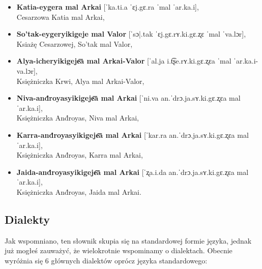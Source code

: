 \begin{spacing}{1.1}
\begin{itemize}
\item \textbf{Katia-eygera mal Arkai} [ˈka.ti.a ˈɛj.gɛ.ra ˈmal ˈar.ka.i],\\ 
Cesarzowa Katia mal Arkai,
\item \textbf{So'tak-eygeryikigeje mal Valor} [ˈsɔ|.tak ˈɛj.gɛ.rʏ.ki.gɛ.ʐɛ 
ˈmal ˈva.lɔr],\\ Ksiażę Cesarzowej, So'tak mal Valor,
\item \textbf{Alya-icheryikigeje͞a mal Arkai-Valor} [ˈal.ja i.t͡ʂe.rʏ.ki.gɛ.ʐɛa ˈmal 
ˈar.ka.i-va.lɔr],\\ Księżniczka Krwi, Alya mal Arkai-Valor,
\item \textbf{Niva-and́royasyikigeje͞a mal Arkai} [ˈni.va an.ˈdrɔ.ja.sʏ.ki.gɛ.ʐɛa 
mal ˈar.ka.i],\\ Księżniczka And́royas, Niva mal Arkai,
\item \textbf{Karra-and́royasyikigeje͞a mal Arkai} [ˈkar.ra an.ˈdrɔ.ja.sʏ.ki.gɛ.ʐɛa 
mal ˈar.ka.i],\\ Księżniczka And́royas, Karra mal Arkai,
\item \textbf{Jaida-and́royasyikigeje͞a mal Arkai} [ˈʐa.i.da an.ˈdrɔ.ja.sʏ.ki.gɛ.ʐɛa
mal ˈar.ka.i],\\ Księżniczka And́royas, Jaida mal Arkai.
\end{itemize}


\subsection{Dialekty}
Jak wspomniano, ten słownik skupia się na standardowej formie języka, jednak już
mogłeś zauważyć, że wielokrotnie wspominamy o dialektach. Obecnie wyróżnia się 6
głównych dialektów oprócz języka standardowego:


\end{spacing}
